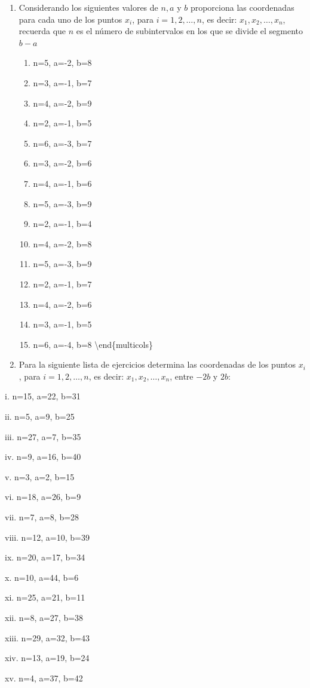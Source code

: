 \documentclass[]{book}
\begin{document}
\begin{enumerate}
\def\labelenumi{\arabic{enumi}.}
\setcounter{enumi}{1}
\item
  Considerando los siguientes valores de \(n,a\) y \(b\) proporciona las
  coordenadas para cada uno de los puntos \(x_i\), para
  \(i=1,2,\ldots,n\), es decir: \(x_1,x_2,\ldots,x_n\), recuerda que
  \(n\) es el número de subintervalos en los que se divide el segmento
  \(b-a\)

  \begin{enumerate}
  \def\labelenumii{\roman{enumii}.}
  \item
    n=5, a=-2, b=8
  \item
    n=3, a=-1, b=7
  \item
    n=4, a=-2, b=9
  \item
    n=2, a=-1, b=5
  \item
    n=6, a=-3, b=7
  \item
    n=3, a=-2, b=6
  \item
    n=4, a=-1, b=6
  \item
    n=5, a=-3, b=9
  \item
    n=2, a=-1, b=4
  \item
    n=4, a=-2, b=8
  \item
    n=5, a=-3, b=9
  \item
    n=2, a=-1, b=7
  \item
    n=4, a=-2, b=6
  \item
    n=3, a=-1, b=5
  \item
    n=6, a=-4, b=8 \textbackslash{}end\{multicols\}
  \end{enumerate}
\item
  Para la siguiente lista de ejercicios determina las coordenadas de los
  puntos \(x_i\), para \(i=1,2,\ldots,n\), es decir:
  \(x_1,x_2,\ldots,x_n\), entre \(-2b\) y \(2b\):
\end{enumerate}

\begin{multicols}{2}
   
    i. n=15, a=22, b=31
   
    ii. n=5, a=9, b=25
   
    iii. n=27, a=7, b=35
   
    iv. n=9, a=16, b=40
   
    v. n=3, a=2, b=15
   
    vi. n=18, a=26, b=9
   
    vii. n=7, a=8, b=28
   
    viii. n=12, a=10, b=39
   
    ix. n=20, a=17, b=34
   
    x. n=10, a=44, b=6
   
    xi. n=25, a=21, b=11
   
    xii. n=8, a=27, b=38
   
    xiii. n=29, a=32, b=43
   
    xiv. n=13, a=19, b=24
   
    xv. n=4, a=37, b=42
\end{multicols}
\end{document}
